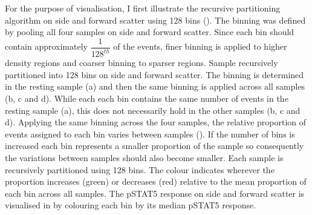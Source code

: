 For the purpose of visualisation, I first illustrate the recursive partitioning algorithm on side and forward scatter using 128 bins ().
The binning was defined by pooling all four samples on side and forward scatter.
Since each bin should contain approximately $\dfrac{1}{128^{th}}$ of the events, finer binning is applied to higher density regions and coarser binning to sparser regions.
{Sample recursively partitioned into 128 bins on side and forward scatter.}
{
   The binning is determined in the resting sample (a) and then the same binning is applied across all samples (b, c and d).
   While each each bin contains the same number of events in the resting sample (a), this does not necessarily hold in the
   other samples (b, c and d).
}
Applying the same binning across the four samples, the relative proportion of events assigned to each bin varies between samples ().
If the number of bins is increased each bin represents a smaller proportion of the sample so consequently the variations between samples should also become smaller.
{Each sample is recursively partitioned using 128 bins.}
{
  The colour indicates wherever the proportion increases (green) or decreases (red) relative to the mean proportion of each bin across all samples.
}
The pSTAT5 response on side and forward scatter is visualised in  by colouring each bin by its median pSTAT5 response.
